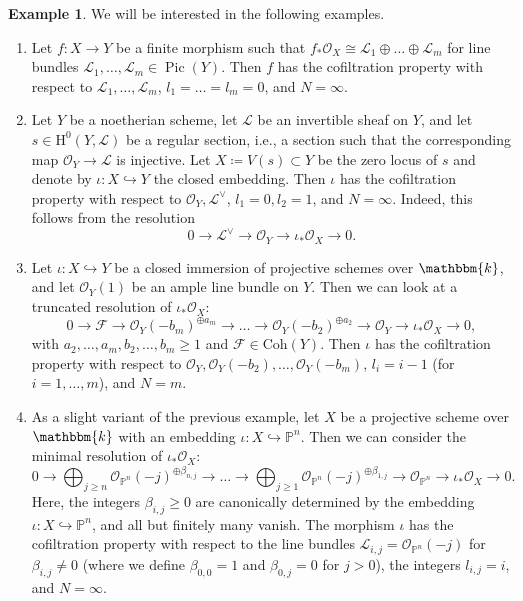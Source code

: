 \documentclass[11pt, reqno]{amsart}
\numberwithin{equation}{section}
\theoremstyle{plain}
\theoremstyle{remark}
\theoremstyle{definition}
\newtheorem{example}[theorem]{Example}
\theoremstyle{italicsname}
\newcommand{\Coh}{\mathrm{Coh}}
\DeclareMathOperator{\Pic}{Pic}
\newcommand{\cO}{\mathcal{O}}
\newcommand{\cF}{\mathcal{F}}
\newcommand{\cL}{\mathcal{L}}
\newcommand{\rH}{\mathrm{H}}
\newcommand{\KK}{\mathbbm{k}}
\def\PP{\ensuremath{\mathbb{P}}}
\begin{document}
\begin{example}\label{ex:Pullback}
We will be interested in the following  examples.
\begin{enumerate}
\item\label{enum:etale2} Let $f\colon X\to Y$ be a finite morphism such that $f_*\cO_X\cong\cL_1\oplus\dots\oplus\cL_m$ for line bundles $\cL_1,\dots,\cL_m\in\Pic(Y)$. Then $f$ has the cofiltration property with respect to $\cL_1,\dots,\cL_m$, $l_1=\dots=l_m=0$, and $N = \infty$. 

\item \label{enum:regular-section}
Let $Y$ be a noetherian scheme, let $\cL$ be an invertible sheaf on $Y$, and let $s\in \rH^0(Y,\cL)$ be a regular section, i.e., a section such that the corresponding map $\cO_Y \to \cL$ is injective. 
Let $X \coloneqq V(s) \subset Y$ be the zero locus of $s$ and denote by $\iota\colon X\hookrightarrow Y$ the closed embedding. 
Then $\iota$ has the cofiltration property with respect to $\cO_Y, \cL^{\vee}$, $l_1 = 0, l_2=1$, and $N = \infty$. 
Indeed, this follows from the resolution 
\[
0\longrightarrow\cL^\vee\longrightarrow\cO_Y\longrightarrow\iota_*\cO_X\longrightarrow0. 
\]

\item\label{enum:immersions} Let $\iota\colon X\hookrightarrow Y$ be a closed immersion of projective schemes over $\KK$, and let $\cO_Y(1)$ be an ample line bundle on $Y$. 
Then we can look at a truncated resolution of $\iota_*\cO_X$: 
\[
0\longrightarrow \cF\longrightarrow\cO_Y(-b_m)^{\oplus a_m}\longrightarrow\dots\longrightarrow\cO_Y(-b_2)^{\oplus a_2}\longrightarrow\cO_Y\longrightarrow\iota_*\cO_X\longrightarrow 0,
\]
with $a_2,\dots,a_m,b_2,\dots,b_m\geq1$ and $\cF\in\Coh(Y)$.
Then $\iota$ has the cofiltration property with respect to $\cO_Y,\cO_Y(-b_2),\dots,\cO_Y(-b_m)$, $l_i=i-1$ (for $i=1,\dots,m$), and $N=m$. 

\item \label{enum:minimal-resolution} As a slight variant of the previous example, let $X$ be a projective scheme over $\KK$ with an embedding $\iota \colon X \hookrightarrow \PP^n$. Then we can consider the minimal resolution of $\iota_*\cO_X$: 
\[
0\longrightarrow \bigoplus_{j \geq n} \cO_{\PP^n}(-j)^{\oplus \beta_{n,j}}\longrightarrow\dots\longrightarrow\bigoplus_{j\geq 1} \cO_{\PP^n}(-j)^{\oplus \beta_{1,j}}\longrightarrow\cO_{\PP^n}\longrightarrow\iota_*\cO_X\longrightarrow 0. 
\]
Here, the integers $\beta_{i,j} \geq 0$ are canonically determined by the embedding $\iota \colon X \hookrightarrow \PP^n$, and all but finitely many vanish. 
The morphism $\iota$ has the cofiltration property with respect to the line bundles $\cL_{i,j} = \cO_{\PP^n}(-j)$ for $\beta_{i,j} \neq 0$ (where we define $\beta_{0,0} = 1$ and $\beta_{0,j} = 0$ for $j > 0$), the integers $l_{i,j} = i$, and $N = \infty$.
\end{enumerate}   
\end{example}
\end{document}
